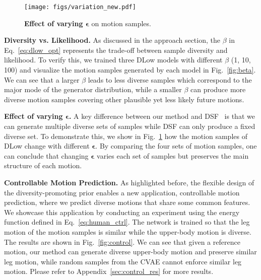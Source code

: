 \documentclass[runningheads]{llncs}
\begin{document}
	\begin{figure}[t]
		\centering
		\texttt{[image: figs/variation\_new.pdf]}
		\vspace{-5mm}
		\caption{\textbf{Effect of varying $\boldsymbol{\epsilon}$} on motion samples. }
		\label{fig:var}
		\vspace{-3mm}
	\end{figure}
	
	\vspace{1mm}
	\noindent\textbf{Diversity vs. Likelihood.} As discussed in the approach section, the $\beta$ in Eq.~\eqref{eq:dlow_opt} represents the trade-off between sample diversity and likelihood. To verify this, we trained three DLow models with different $\beta$ (1, 10, 100) and visualize the motion samples generated by each model in Fig.~\ref{fig:beta}. We can see that a larger $\beta$ leads to less diverse samples which correspond to the major mode of the generator distribution, while a smaller $\beta$ can produce more diverse motion samples covering other plausible yet less likely future motions.
	
	\vspace{1mm}
	\noindent\textbf{Effect of varying $\boldsymbol{\epsilon}$.} A key difference between our method and DSF~\cite{yuan2019diverse} is that we can generate multiple diverse sets of samples while DSF can only produce a fixed diverse set. To demonstrate this, we show in Fig.~\ref{fig:var} how the motion samples of DLow change with different $\boldsymbol{\epsilon}$. By comparing the four sets of motion samples, one can conclude that changing $\boldsymbol{\epsilon}$ varies each set of samples but preserves the main structure of each motion.
	
	\vspace{1mm}
	\noindent\textbf{Controllable Motion Prediction.}
	As highlighted before, the flexible design of the diversity-promoting prior enables a new application, controllable motion prediction, where we predict diverse motions that share some common features. We showcase this application by conducting an experiment using the energy function defined in Eq.~\eqref{eq:human_ctrl}. 
	The network is trained so that the leg motion of the motion samples is similar while the upper-body motion is diverse.
	The results are shown in Fig.~\ref{fig:control}. We can see that given a reference motion, our method can generate diverse upper-body motion and preserve similar leg motion, while random samples from the CVAE cannot enforce similar leg motion. Please refer to Appendix~\ref{sec:control_res} for more results.
	
\end{document}
